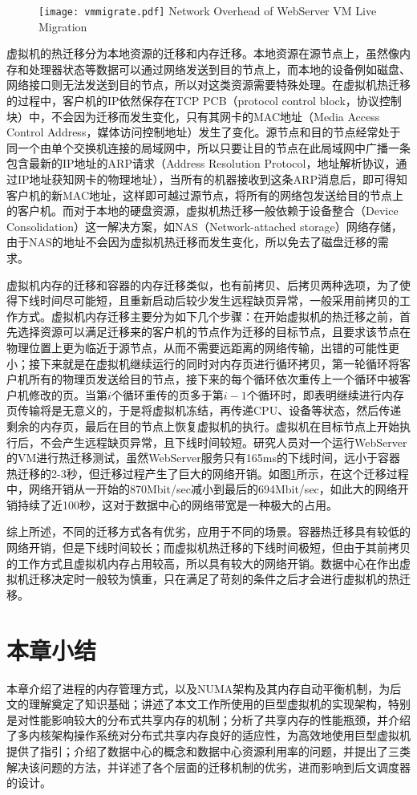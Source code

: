 \begin{figure}[!htp]
  \centering
  \texttt{[image: vmmigrate.pdf]}
    {Network Overhead of WebServer VM Live Migration}
  \label{fig:livem}
\end{figure}

虚拟机的热迁移\cite{livemigration}分为本地资源的迁移和内存迁移。本地资源在源节点上，虽然像内存和处理器状态等数据可以通过网络发送到目的节点上，而本地的设备例如磁盘、网络接口则无法发送到目的节点，所以对这类资源需要特殊处理。在虚拟机热迁移的过程中，客户机的IP依然保存在TCP PCB（protocol control block，协议控制块）中，不会因为迁移而发生变化，只有其网卡的MAC地址（Media Access Control Address，媒体访问控制地址）发生了变化。源节点和目的节点经常处于同一个由单个交换机连接的局域网中，所以只要让目的节点在此局域网中广播一条包含最新的IP地址的ARP请求（Address Resolution Protocol，地址解析协议，通过IP地址获知网卡的物理地址），当所有的机器接收到这条ARP消息后，即可得知客户机的新MAC地址，这样即可越过源节点，将所有的网络包发送给目的节点上的客户机。而对于本地的硬盘资源，虚拟机热迁移一般依赖于设备整合（Device Consolidation）这一解决方案，如NAS（Network-attached storage）网络存储，由于NAS的地址不会因为虚拟机热迁移而发生变化，所以免去了磁盘迁移的需求。

\label{chap:mmm}
虚拟机内存的迁移和容器的内存迁移类似，也有前拷贝、后拷贝两种选项，为了使得下线时间尽可能短，且重新启动后较少发生远程缺页异常，一般采用前拷贝的工作方式。虚拟机内存迁移主要分为如下几个步骤：在开始虚拟机的热迁移之前，首先选择资源可以满足迁移来的客户机的节点作为迁移的目标节点，且要求该节点在物理位置上更为临近于源节点，从而不需要远距离的网络传输，出错的可能性更小；接下来就是在虚拟机继续运行的同时对内存页进行循环拷贝，第一轮循环将客户机所有的物理页发送给目的节点，接下来的每个循环依次重传上一个循环中被客户机修改的页。当第$i$个循环重传的页多于第$i-1$个循环时，即表明继续进行内存页传输将是无意义的，于是将虚拟机冻结，再传递CPU、设备等状态，然后传递剩余的内存页，最后在目的节点上恢复虚拟机的执行。虚拟机在目标节点上开始执行后，不会产生远程缺页异常，且下线时间较短。研究人员对一个运行WebServer的VM进行热迁移测试，虽然WebServer服务只有165ms的下线时间，远小于容器热迁移的2-3秒，但迁移过程产生了巨大的网络开销。如图\ref{fig:livem}所示，在这个迁移过程中，网络开销从一开始的870Mbit/sec减小到最后的694Mbit/sec，如此大的网络开销持续了近100秒\cite{livemigration}，这对于数据中心的网络带宽是一种极大的占用。

综上所述，不同的迁移方式各有优劣，应用于不同的场景。容器热迁移具有较低的网络开销，但是下线时间较长；而虚拟机热迁移的下线时间极短，但由于其前拷贝的工作方式且虚拟机内存占用较高，所以具有较大的网络开销。数据中心在作出虚拟机迁移决定时一般较为慎重，只在满足了苛刻的条件之后才会进行虚拟机的热迁移。

\section{本章小结}
本章介绍了进程的内存管理方式，以及NUMA架构及其内存自动平衡机制，为后文的理解奠定了知识基础；讲述了本文工作所使用的巨型虚拟机的实现架构，特别是对性能影响较大的分布式共享内存的机制；分析了共享内存的性能瓶颈，并介绍了多内核架构操作系统对分布式共享内存良好的适应性，为高效地使用巨型虚拟机提供了指引；介绍了数据中心的概念和数据中心资源利用率的问题，并提出了三类解决该问题的方法，并详述了各个层面的迁移机制的优劣，进而影响到后文调度器的设计。